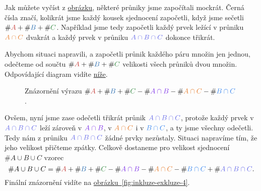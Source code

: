 Jak můžete vyčíst z \hyperref[fig:inkluze-exkluze-2]{obrázku}, některé průniky
jsme započítali mockrát. Černá čísla značí, kolikrát jsme každý kousek
sjednocení započetli, když jsme sečetli $\# \clr{A} + \# \clb{B} + \# \clg{C}$.
Například jsme tedy započetli každý prvek ležící v průniku
$\textcolor[HTML]{e78033}{A \cap C}$ dvakrát a každý prvek v průniku
$\textcolor[HTML]{6a6ee9}{A \cap B \cap C}$ dokonce třikrát.

Abychom situaci napravili, a započetli průnik každého páru množin jen jednou,
odečteme od součtu $\# \clr{A} + \# \clb{B} + \# \clg{C}$ velikosti všech
průniků dvou množin. Odpovídající diagram vidíte
\hyperref[fig:inkluze-exkluze-3]{níže}.

\begin{figure}[h]
 \centering
 \caption{Znázornění výrazu $\# \clr{A} + \# \clb{B} + \# \clg{C} - \#
 \textcolor[HTML]{7f33e8}{A \cap B} - \# \textcolor[HTML]{e78033}{A \cap C} - \#
 \textcolor[HTML]{3a87ef}{B \cap C}$.}
 \label{fig:inkluze-exkluze-3}
\end{figure}

Ovšem, nyní jsme zase odečetli třikrát průnik $\textcolor[HTML]{6a6ee9}{A \cap B
\cap C}$, protože každý prvek v $\textcolor[HTML]{6a6ee9}{A \cap B \cap C}$ leží
zároveň v $\textcolor[HTML]{7f33e8}{A \cap B}$, v $\textcolor[HTML]{e78033}{A
\cap C}$ i v $\textcolor[HTML]{3a87ef}{B \cap C}$, a ty jsme všechny odečetli.
Tedy nám z průniku $\textcolor[HTML]{6a6ee9}{A \cap B \cap C}$ žádné prvky
nezůstaly. Situaci napravíme tím, že jeho velikost přičteme zpátky. Celkově
dostaneme pro velikost sjednocení $\# A \cup B \cup C$ vzorec
\[
 \# A \cup B \cup C = \# \clr{A} + \# \clb{B} + \# \clg{C} - \#
 \textcolor[HTML]{7f33e8}{A \cap B} - \# \textcolor[HTML]{e78033}{A \cap C} - \#
 \textcolor[HTML]{3a87ef}{B \cap C} + \# \textcolor[HTML]{6a6ee9}{A \cap B \cap
 C}.
\]
Finální znázornění vidíte na
\hyperref[fig:inkluze-exkluze-4]{obrázku~\ref*{fig:inkluze-exkluze-4}}.

